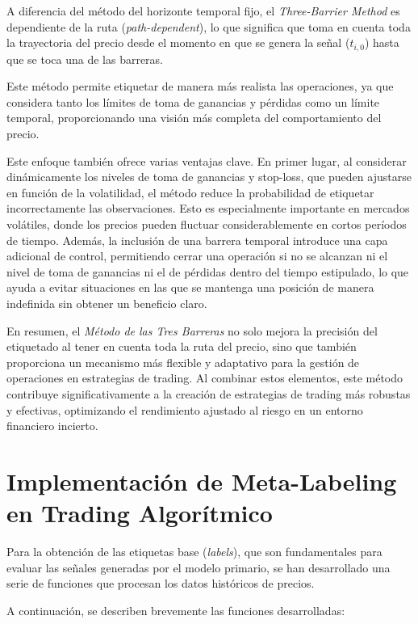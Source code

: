\documentclass[a4paper,12pt, twoside]{report}
\begin{document}
A diferencia del método del horizonte temporal fijo, el \textit{Three-Barrier Method} 
es dependiente de la ruta (\textit{path-dependent}), lo que significa que toma en cuenta 
toda la trayectoria del precio desde el momento en que se genera la señal ($t_{i,0}$) 
hasta que se toca una de las barreras. 

Este método permite etiquetar de manera más realista las operaciones, ya que considera 
tanto los límites de toma de ganancias y pérdidas como un límite temporal, proporcionando 
una visión más completa del comportamiento del precio.

Este enfoque también ofrece varias ventajas clave. En primer lugar, al considerar 
dinámicamente los niveles de toma de ganancias y stop-loss, que pueden ajustarse en 
función de la volatilidad, el método reduce la probabilidad de etiquetar incorrectamente 
las observaciones. Esto es especialmente importante en mercados volátiles, donde los 
precios pueden fluctuar considerablemente en cortos períodos de tiempo. Además, 
la inclusión de una barrera temporal introduce una capa adicional de control, 
permitiendo cerrar una operación si no se alcanzan ni el nivel de toma de ganancias 
ni el de pérdidas dentro del tiempo estipulado, lo que ayuda a evitar situaciones en 
las que se mantenga una posición de manera indefinida sin obtener un beneficio claro.

En resumen, el \textit{Método de las Tres Barreras} no solo mejora la precisión del 
etiquetado al tener en cuenta toda la ruta del precio, sino que también proporciona 
un mecanismo más flexible y adaptativo para la gestión de operaciones en estrategias 
de trading. Al combinar estos elementos, este método contribuye significativamente a 
la creación de estrategias de trading más robustas y efectivas, optimizando el 
rendimiento ajustado al riesgo en un entorno financiero incierto.

\section{Implementación de Meta-Labeling en Trading Algorítmico}

Para la obtención de las etiquetas base (\textit{labels}), que 
son fundamentales para evaluar las señales generadas por el modelo primario, se han 
desarrollado una serie de funciones que procesan los datos históricos de precios.

A continuación, se describen brevemente las funciones desarrolladas:
\end{document}
